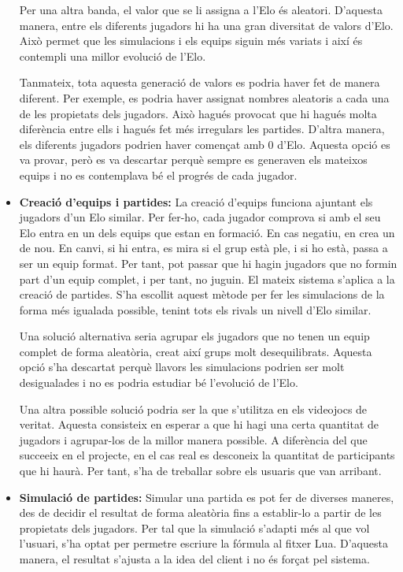 \documentclass[a4paper]{article}
\begin{document}
\begin{itemize}
    Per una altra banda, el valor que se li assigna a l'Elo és aleatori. D'aquesta manera, entre els diferents jugadors hi ha una gran diversitat de valors d'Elo. Això permet que les simulacions i els equips siguin més variats i així és contempli una millor evolució de l'Elo.
    
    Tanmateix, tota aquesta generació de valors es podria haver fet de manera diferent. Per exemple, es podria haver assignat nombres aleatoris a cada una de les propietats dels jugadors. Això hagués provocat que hi hagués molta diferència entre ells i hagués fet més irregulars les partides. D'altra manera, els diferents jugadors podrien haver començat amb 0 d'Elo. Aquesta opció es va provar, però es va descartar perquè sempre es generaven els mateixos equips i no es contemplava bé el progrés de cada jugador.
    
    \item \textbf{Creació d'equips i partides:} La creació d'equips funciona ajuntant els jugadors d'un Elo similar. Per fer-ho, cada jugador comprova si amb el seu Elo entra en un dels equips que estan en formació. En cas negatiu, en crea un de nou. En canvi, si hi entra, es mira si el grup està ple, i si ho està, passa a ser un equip format. Per tant, pot passar que hi hagin jugadors que no formin part d'un equip complet, i per tant, no juguin. El mateix sistema s'aplica a la creació de partides. S'ha escollit aquest mètode per fer les simulacions de la forma més igualada possible, tenint tots els rivals un nivell d'Elo similar. 
    
    Una solució alternativa seria agrupar els jugadors que no tenen un equip complet de forma aleatòria, creat així grups molt desequilibrats. Aquesta opció s'ha descartat perquè llavors les simulacions podrien ser molt desigualades i no es podria estudiar bé l'evolució de l'Elo. 
    
    Una altra possible solució podria ser la que s'utilitza en els videojocs de veritat. Aquesta consisteix en esperar a que hi hagi una certa quantitat de jugadors i agrupar-los de la millor manera possible. A diferència del que succeeix en el projecte, en el cas real es desconeix la quantitat de participants que hi haurà. Per tant, s'ha de treballar sobre els usuaris que van arribant.   
    
    \item \textbf{Simulació de partides:} Simular una partida es pot fer de diverses maneres, des de decidir el resultat de forma aleatòria fins a establir-lo a partir de les propietats dels jugadors. Per tal que la simulació s'adapti més al que vol l'usuari, s'ha optat per permetre escriure la fórmula al fitxer Lua. D'aquesta manera, el resultat s'ajusta a la idea del client i no és forçat pel sistema.
    

\end{itemize}
\end{document}
